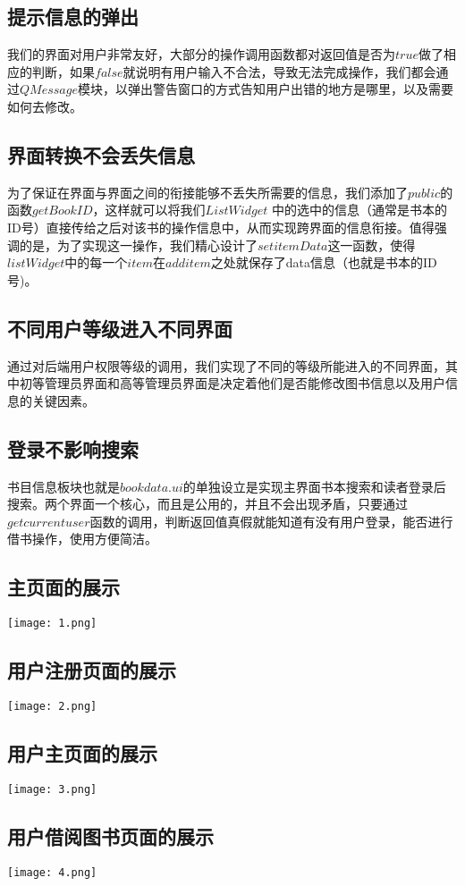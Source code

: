 \documentclass[UTF8]{ctexart}
\begin{document}
\subsection{提示信息的弹出}
我们的界面对用户非常友好，大部分的操作调用函数都对返回值是否为$true$做了相应的判断，如果$false$就说明有用户输入不合法，导致无法完成操作，我们都会通过$QMessage$模块，以弹出警告窗口的方式告知用户出错的地方是哪里，以及需要如何去修改。
\subsection{界面转换不会丢失信息}
为了保证在界面与界面之间的衔接能够不丢失所需要的信息，我们添加了$public$的函数$getBookID$，这样就可以将我们$ListWidget$ 中的选中的信息（通常是书本的ID号）直接传给之后对该书的操作信息中，从而实现跨界面的信息衔接。值得强调的是，为了实现这一操作，我们精心设计了$setitemData$这一函数，使得$listWidget$中的每一个$item$在$additem$之处就保存了data信息（也就是书本的ID号)。
\subsection{不同用户等级进入不同界面}
通过对后端用户权限等级的调用，我们实现了不同的等级所能进入的不同界面，其中初等管理员界面和高等管理员界面是决定着他们是否能修改图书信息以及用户信息的关键因素。
\subsection{登录不影响搜索}
书目信息板块也就是$bookdata.ui$的单独设立是实现主界面书本搜索和读者登录后搜索。两个界面一个核心，而且是公用的，并且不会出现矛盾，只要通过$getcurrentuser$函数的调用，判断返回值真假就能知道有没有用户登录，能否进行借书操作，使用方便简洁。
\subsection{主页面的展示}
\texttt{[image: 1.png]}
\subsection{用户注册页面的展示}
\texttt{[image: 2.png]}
\subsection{用户主页面的展示}
\texttt{[image: 3.png]}
\subsection{用户借阅图书页面的展示}
\texttt{[image: 4.png]}
\end{document}
